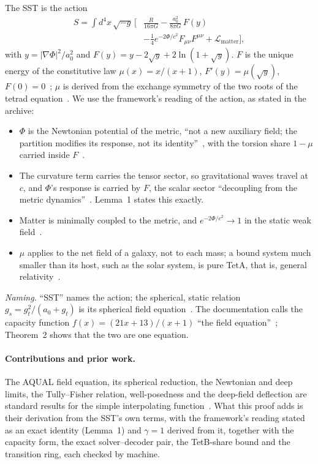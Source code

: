 \documentclass[twocolumn]{iopjournal}
\begin{document}
The SST is the action~\cite{NelsonL3,NelsonL3supp,NelsonII}
\begin{equation}
\begin{aligned}
S = \int d^4x\,\sqrt{-g}\,\Big[&\frac{R}{16\pi G}
 - \frac{a_0^2}{8\pi G}\,F(y)\\
&- \tfrac14 e^{-2\Phi/c^2}F_{\mu\nu}F^{\mu\nu}
 + \mathcal L_{\mathrm{matter}}\Big],
\end{aligned}
\label{eq:sst}
\end{equation}
with $y = |\nabla\Phi|^2/a_0^2$ and
$F(y) = y - 2\sqrt y + 2\ln(1 + \sqrt y)$. $F$ is the unique energy of
the constitutive law $\mu(x) = x/(x+1)$, $F'(y) = \mu(\sqrt y)$,
$F(0) = 0$~\cite{NelsonPaqual}; $\mu$ is derived from the exchange
symmetry of the two roots of the tetrad equation~\cite{NelsonL2,NelsonPexch}.
We use the framework's reading of the action, as stated in the
archive:
\begin{itemize}
\item[(i)] $\Phi$ is the Newtonian potential of the metric, ``not a new
auxiliary field; the partition modifies its response, not its
identity''~\cite{NelsonL3}, with the torsion share $1 - \mu$ carried
inside $F$~\cite{NelsonL3supp}.
\item[(ii)] The curvature term carries the tensor sector, so
gravitational waves travel at $c$, and $\Phi$'s response is carried by
$F$, the scalar sector ``decoupling from the metric
dynamics''~\cite{NelsonL3supp}. Lemma~1 states this exactly.
\item[(iii)] Matter is minimally coupled to the metric, and
$e^{-2\Phi/c^2} \to 1$ in the static weak field~\cite{NelsonRAR}.
\item[(iv)] $\mu$ applies to the net field of a galaxy, not to each
mass; a bound system much smaller than its host, such as the solar
system, is pure TetA, that is, general
relativity~\cite{NelsonColes,NelsonTetA}.
\end{itemize}
\textit{Naming.} ``SST'' names the action; the spherical, static
relation $g_s = g_t^2/(a_0 + g_t)$ is its spherical field
equation~\cite{NelsonColes}. The documentation calls the capacity
function $f(x) = (21x+13)/(x+1)$ ``the field equation''~\cite{NelsonDocs};
Theorem~2 shows that the two are one equation.

\paragraph{Contributions and prior work.} The AQUAL field equation, its
spherical reduction, the Newtonian and deep limits, the Tully--Fisher
relation, well-posedness and the deep-field deflection are standard
results for the simple interpolating
function~\cite{BekensteinMilgrom1984,Milgrom1983,FamaeyMcGaugh2012}.
What this proof adds is their derivation from the SST's own terms, with
the framework's reading stated as an exact identity (Lemma~1) and
$\gamma = 1$ derived from it, together with the capacity form, the
exact solver--decoder pair, the TetB-share bound and the transition
ring, each checked by machine.
\end{document}
